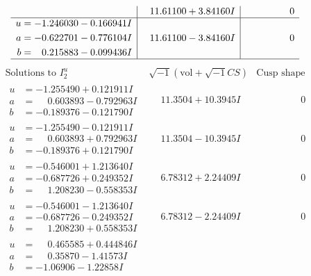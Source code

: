 \documentclass[1p]{elsarticle_modified}
\theoremstyle{definition}
\newcommand{\I}{\sqrt{-1}}
\begin{document}
$$\begin{array}{c|c|c}
 & \phantom{-}11.61100 + 3.84160 I & \phantom{-0.000000 } 0 \\ \hline\begin{aligned}
u &= -1.246030 - 0.166941 I \\
a &= -0.622701 - 0.776104 I \\
b &= \phantom{-}0.215883 - 0.099436 I\end{aligned}
 & \phantom{-}11.61100 - 3.84160 I & \phantom{-0.000000 } 0\\
 \hline 
 \end{array}$$\newpage$$\begin{array}{c|c|c}  
\text{Solutions to }I^u_{2}& \I (\text{vol} + \sqrt{-1}CS) & \text{Cusp shape}\\
 \hline 
\begin{aligned}
u &= -1.255490 + 0.121911 I \\
a &= \phantom{-}0.603893 - 0.792963 I \\
b &= -0.189376 - 0.121790 I\end{aligned}
 & \phantom{-}11.3504 + 10.3945 I & \phantom{-0.000000 } 0 \\ \hline\begin{aligned}
u &= -1.255490 - 0.121911 I \\
a &= \phantom{-}0.603893 + 0.792963 I \\
b &= -0.189376 + 0.121790 I\end{aligned}
 & \phantom{-}11.3504 - 10.3945 I & \phantom{-0.000000 } 0 \\ \hline\begin{aligned}
u &= -0.546001 + 1.213640 I \\
a &= -0.687726 + 0.249352 I \\
b &= \phantom{-}1.208230 - 0.558353 I\end{aligned}
 & \phantom{-}6.78312 + 2.24409 I & \phantom{-0.000000 } 0 \\ \hline\begin{aligned}
u &= -0.546001 - 1.213640 I \\
a &= -0.687726 - 0.249352 I \\
b &= \phantom{-}1.208230 + 0.558353 I\end{aligned}
 & \phantom{-}6.78312 - 2.24409 I & \phantom{-0.000000 } 0 \\ \hline\begin{aligned}
u &= \phantom{-}0.465585 + 0.444846 I \\
a &= \phantom{-}0.35870 - 1.41573 I \\
b &= -1.06906 - 1.22858 I\end{aligned}

\end{array}$$
\end{document}
